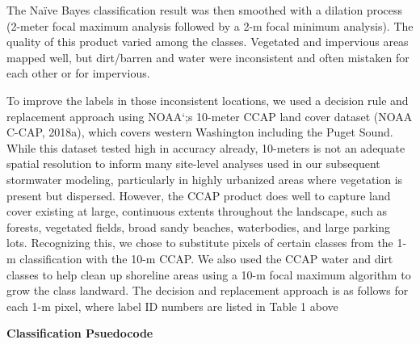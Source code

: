\documentclass[
]{report}
\begin{document}
The Naïve Bayes classification result was then smoothed with a dilation process (2-meter focal maximum analysis followed by a 2-m focal minimum analysis). The quality of this product varied among the classes. Vegetated and impervious areas mapped well, but dirt/barren and water were inconsistent and often mistaken for each other or for impervious.

To improve the labels in those inconsistent locations, we used a decision rule and replacement approach using NOAA`;s 10-meter CCAP land cover dataset (NOAA C-CAP, 2018a), which covers western Washington including the Puget Sound. While this dataset tested high in accuracy already, 10-meters is not an adequate spatial resolution to inform many site-level analyses used in our subsequent stormwater modeling, particularly in highly urbanized areas where vegetation is present but dispersed. However, the CCAP product does well to capture land cover existing at large, continuous extents throughout the landscape, such as forests, vegetated fields, broad sandy beaches, waterbodies, and large parking lots. Recognizing this, we chose to substitute pixels of certain classes from the 1-m classification with the 10-m CCAP. We also used the CCAP water and dirt classes to help clean up shoreline areas using a 10-m focal maximum algorithm to grow the class landward. The decision and replacement approach is as follows for each 1-m pixel, where label ID numbers are listed in Table 1 above

\textbf{Classification Psuedocode}
\end{document}
